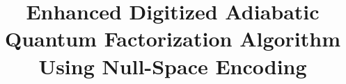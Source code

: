 \documentclass{dissertation}
\newcommand{\1}{\mathbbm{1}}
\begin{document}
\title{Enhanced Digitized Adiabatic Quantum Factorization Algorithm Using Null-Space Encoding}

\frontmatter




% 


% 


%






\thispagestyle{empty}
\tableofcontents
\let\cleardoublepage\clearpage




\mainmatter

\thumbtrue




















\end{document}
